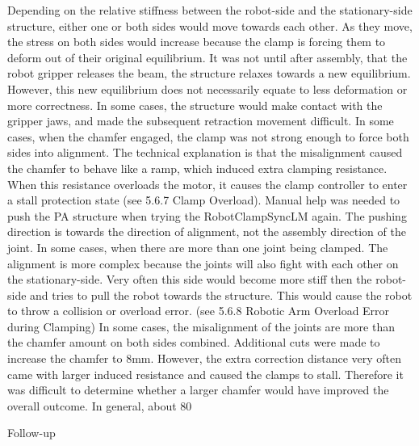 Depending on the relative stiffness between the robot-side and the stationary-side structure, either one or both sides would move towards each other. As they move, the stress on both sides would increase because the clamp is forcing them to deform out of their original equilibrium. It was not until after assembly, that the robot gripper releases the beam, the structure relaxes towards a new equilibrium. However, this new equilibrium does not necessarily equate to less deformation or more correctness. In some cases, the structure would make contact with the gripper jaws, and made the subsequent retraction movement difficult. 
In some cases, when the chamfer engaged, the clamp was not strong enough to force both sides into alignment. The technical explanation is that the misalignment caused the chamfer to behave like a ramp, which induced extra clamping resistance. When this resistance overloads the motor, it causes the clamp controller to enter a stall protection state (see 5.6.7 Clamp Overload). Manual help was needed to push the PA structure when trying the RobotClampSyncLM again. The pushing direction is towards the direction of alignment, not the assembly direction of the joint.
In some cases, when there are more than one joint being clamped. The alignment is more complex because the joints will also fight with each other on the stationary-side. Very often this side would become more stiff then the robot-side and tries to pull the robot towards the structure. This would cause the robot to throw a collision or overload error. (see 5.6.8 Robotic Arm Overload Error during Clamping)
In some cases, the misalignment of the joints are more than the chamfer amount on both sides combined. Additional cuts were made to increase the chamfer to 8mm. However, the extra correction distance very often came with larger induced resistance and caused the clamps to stall. Therefore it was difficult to determine whether a larger chamfer would have improved the overall outcome. 
In general, about 80%

Follow-up

